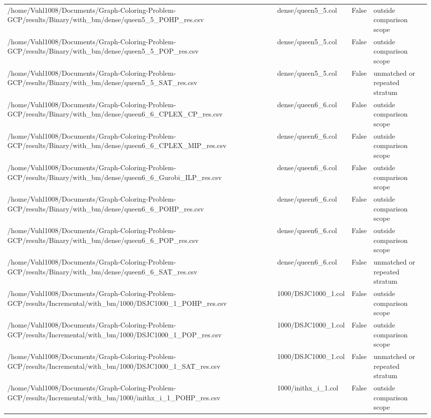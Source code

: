 \begin{table}[htbp]
\begin{tabular}{llll}
/home/Vuhl1008/Documents/Graph-Coloring-Problem-GCP/results/Binary/with\_bm/dense/queen5\_5\_POHP\_res.csv & dense/queen5\_5.col & False & outside comparison scope \\
/home/Vuhl1008/Documents/Graph-Coloring-Problem-GCP/results/Binary/with\_bm/dense/queen5\_5\_POP\_res.csv & dense/queen5\_5.col & False & outside comparison scope \\
/home/Vuhl1008/Documents/Graph-Coloring-Problem-GCP/results/Binary/with\_bm/dense/queen5\_5\_SAT\_res.csv & dense/queen5\_5.col & False & unmatched or repeated stratum \\
/home/Vuhl1008/Documents/Graph-Coloring-Problem-GCP/results/Binary/with\_bm/dense/queen6\_6\_CPLEX\_CP\_res.csv & dense/queen6\_6.col & False & outside comparison scope \\
/home/Vuhl1008/Documents/Graph-Coloring-Problem-GCP/results/Binary/with\_bm/dense/queen6\_6\_CPLEX\_MIP\_res.csv & dense/queen6\_6.col & False & outside comparison scope \\
/home/Vuhl1008/Documents/Graph-Coloring-Problem-GCP/results/Binary/with\_bm/dense/queen6\_6\_Gurobi\_ILP\_res.csv & dense/queen6\_6.col & False & outside comparison scope \\
/home/Vuhl1008/Documents/Graph-Coloring-Problem-GCP/results/Binary/with\_bm/dense/queen6\_6\_POHP\_res.csv & dense/queen6\_6.col & False & outside comparison scope \\
/home/Vuhl1008/Documents/Graph-Coloring-Problem-GCP/results/Binary/with\_bm/dense/queen6\_6\_POP\_res.csv & dense/queen6\_6.col & False & outside comparison scope \\
/home/Vuhl1008/Documents/Graph-Coloring-Problem-GCP/results/Binary/with\_bm/dense/queen6\_6\_SAT\_res.csv & dense/queen6\_6.col & False & unmatched or repeated stratum \\
/home/Vuhl1008/Documents/Graph-Coloring-Problem-GCP/results/Incremental/with\_bm/1000/DSJC1000\_1\_POHP\_res.csv & 1000/DSJC1000\_1.col & False & outside comparison scope \\
/home/Vuhl1008/Documents/Graph-Coloring-Problem-GCP/results/Incremental/with\_bm/1000/DSJC1000\_1\_POP\_res.csv & 1000/DSJC1000\_1.col & False & outside comparison scope \\
/home/Vuhl1008/Documents/Graph-Coloring-Problem-GCP/results/Incremental/with\_bm/1000/DSJC1000\_1\_SAT\_res.csv & 1000/DSJC1000\_1.col & False & unmatched or repeated stratum \\
/home/Vuhl1008/Documents/Graph-Coloring-Problem-GCP/results/Incremental/with\_bm/1000/inithx\_i\_1\_POHP\_res.csv & 1000/inithx\_i\_1.col & False & outside comparison scope \\

\end{tabular}
\end{table}
